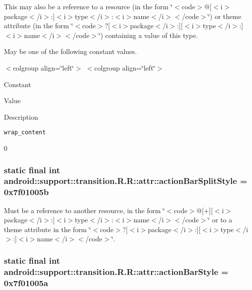 This may also be a reference to a resource (in the form \char`\"{}$<$code$>$@\mbox{[}$<$i$>$package$<$/i$>$:\mbox{]}$<$i$>$type$<$/i$>$:$<$i$>$name$<$/i$>$$<$/code$>$\char`\"{}) or theme attribute (in the form \char`\"{}$<$code$>$?\mbox{[}$<$i$>$package$<$/i$>$:\mbox{]}\mbox{[}$<$i$>$type$<$/i$>$:\mbox{]}$<$i$>$name$<$/i$>$$<$/code$>$\char`\"{}) containing a value of this type. 

May be one of the following constant values. \begin{TabularC}{0}
\hline
\end{TabularC}
$<$colgroup align=\char`\"{}left\char`\"{}$>$ $<$colgroup align=\char`\"{}left\char`\"{}$>$ 

Constant

Value

Description 

{\tt wrap\_\-content}

0\hypertarget{classandroid_1_1support_1_1transition_1_1_r_1_1attr_080d1b67ea7df4af84c1616bf71a0982}{
\subsubsection[{actionBarSplitStyle}]{\setlength{\rightskip}{0pt plus 5cm}static final int android::support::transition.R.R::attr::actionBarSplitStyle = 0x7f01005b}}
\label{classandroid_1_1support_1_1transition_1_1_r_1_1attr_080d1b67ea7df4af84c1616bf71a0982}


Must be a reference to another resource, in the form \char`\"{}$<$code$>$@\mbox{[}+\mbox{]}\mbox{[}$<$i$>$package$<$/i$>$:\mbox{]}$<$i$>$type$<$/i$>$:$<$i$>$name$<$/i$>$$<$/code$>$\char`\"{} or to a theme attribute in the form \char`\"{}$<$code$>$?\mbox{[}$<$i$>$package$<$/i$>$:\mbox{]}\mbox{[}$<$i$>$type$<$/i$>$:\mbox{]}$<$i$>$name$<$/i$>$$<$/code$>$\char`\"{}. \hypertarget{classandroid_1_1support_1_1transition_1_1_r_1_1attr_94579d80fc244ed753acd43c07af920e}{
\subsubsection[{actionBarStyle}]{\setlength{\rightskip}{0pt plus 5cm}static final int android::support::transition.R.R::attr::actionBarStyle = 0x7f01005a}}
\label{classandroid_1_1support_1_1transition_1_1_r_1_1attr_94579d80fc244ed753acd43c07af920e}


